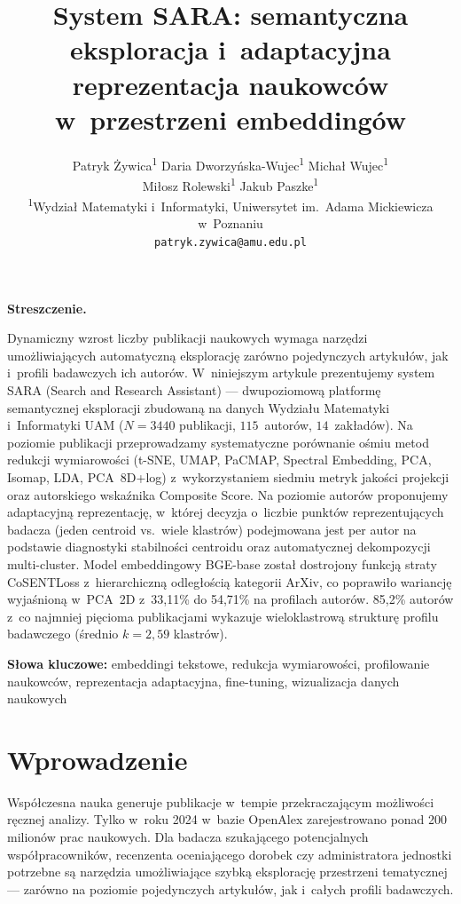 \documentclass[a4paper,11pt,twocolumn]{article}
\title{%
  \Large\bfseries
  System SARA: semantyczna eksploracja i~adaptacyjna\\
  reprezentacja naukowców w~przestrzeni embeddingów%
}
\author{%
  Patryk Żywica\textsuperscript{1} \quad
  Daria Dworzyńska-Wujec\textsuperscript{1} \quad
  Michał Wujec\textsuperscript{1}\\
  Miłosz Rolewski\textsuperscript{1} \quad
  Jakub Paszke\textsuperscript{1}\\[4pt]
  \textsuperscript{1}Wydział Matematyki i~Informatyki,
  Uniwersytet im.~Adama Mickiewicza w~Poznaniu\\
  \texttt{patryk.zywica@amu.edu.pl}
}
\date{}
\renewenvironment{abstract}{%
  \small\quotation\noindent\textbf{Streszczenie.}\enspace
}{\endquotation}
\begin{document}
\maketitle
\thispagestyle{empty}

\begin{abstract}
Dynamiczny wzrost liczby publikacji naukowych wymaga narzędzi umożliwiających
automatyczną eksplorację zarówno pojedynczych artykułów, jak i~profili
badawczych ich autorów. W~niniejszym artykule prezentujemy system SARA
(Search and Research Assistant) --- dwupoziomową platformę semantycznej
eksploracji zbudowaną na danych Wydziału Matematyki i~Informatyki UAM
($N=3440$ publikacji, $115$~autorów, $14$~zakładów).
Na poziomie publikacji przeprowadzamy systematyczne porównanie ośmiu metod
redukcji wymiarowości (t-SNE, UMAP, PaCMAP, Spectral Embedding, PCA,
Isomap, LDA, PCA~8D+log) z~wykorzystaniem siedmiu metryk jakości projekcji
oraz autorskiego wskaźnika Composite Score.
Na poziomie autorów proponujemy adaptacyjną reprezentację, w~której
decyzja o~liczbie punktów reprezentujących badacza (jeden centroid vs.\
wiele klastrów) podejmowana jest per autor na podstawie diagnostyki
stabilności centroidu oraz automatycznej dekompozycji multi-cluster.
Model embeddingowy BGE-base został dostrojony funkcją straty CoSENTLoss
z~hierarchiczną odległością kategorii ArXiv, co poprawiło wariancję
wyjaśnioną w~PCA~2D z~33,11\% do 54,71\% na profilach autorów.
85,2\% autorów z~co najmniej pięcioma publikacjami wykazuje wieloklastrową
strukturę profilu badawczego (średnio $k=2{,}59$ klastrów).
\end{abstract}

\smallskip\noindent
\textbf{Słowa kluczowe:}
embeddingi tekstowe, redukcja wymiarowości, profilowanie naukowców,
reprezentacja adaptacyjna, fine-tuning, wizualizacja danych naukowych

\section{Wprowadzenie}
\label{sec:intro}

Współczesna nauka generuje publikacje w~tempie przekraczającym możliwości
ręcznej analizy. Tylko w~roku 2024 w~bazie OpenAlex zarejestrowano ponad
200 milionów prac naukowych. Dla badacza szukającego potencjalnych
współpracowników, recenzenta oceniającego dorobek czy administratora
jednostki potrzebne są narzędzia umożliwiające szybką eksplorację
przestrzeni tematycznej --- zarówno na poziomie pojedynczych artykułów,
jak i~całych profili badawczych.
\end{document}
